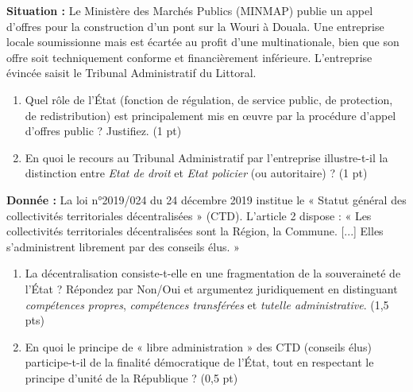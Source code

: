 \documentclass[11pt]{article}
\begin{document}
\begin{exercice}
\textbf{Situation :} Le Ministère des Marchés Publics (MINMAP) publie un appel d'offres pour la construction d'un pont sur la Wouri à Douala. Une entreprise locale soumissionne mais est écartée au profit d'une multinationale, bien que son offre soit techniquement conforme et financièrement inférieure. L'entreprise évincée saisit le Tribunal Administratif du Littoral.
\begin{enumerate}
    \item Quel rôle de l'État (fonction de régulation, de service public, de protection, de redistribution) est principalement mis en œuvre par la procédure d'appel d'offres public ? Justifiez. (1 pt)
    \item En quoi le recours au Tribunal Administratif par l'entreprise illustre-t-il la distinction entre \textit{Etat de droit} et \textit{Etat policier} (ou autoritaire) ? (1 pt)
\end{enumerate}
\end{exercice}

\begin{exercice}
\textbf{Donnée :} La loi n°2019/024 du 24 décembre 2019 institue le « Statut général des collectivités territoriales décentralisées » (CTD). L'article 2 dispose : « Les collectivités territoriales décentralisées sont la Région, la Commune. [...] Elles s'administrent librement par des conseils élus. »
\begin{enumerate}
    \item La décentralisation consiste-t-elle en une fragmentation de la souveraineté de l'État ? Répondez par Non/Oui et argumentez juridiquement en distinguant \textit{compétences propres}, \textit{compétences transférées} et \textit{tutelle administrative}. (1,5 pts)
    \item En quoi le principe de « libre administration » des CTD (conseils élus) participe-t-il de la finalité démocratique de l'État, tout en respectant le principe d'unité de la République ? (0,5 pt)
\end{enumerate}
\end{exercice}
\end{document}
